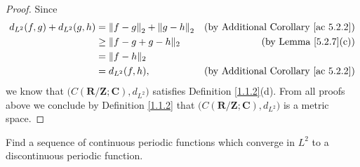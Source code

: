 \begin{proof}
    Since
    \begin{align*}
        d_{L^2}(f, g) + d_{L^2}(g, h) & = \norm*{f - g}_2 + \norm*{g - h}_2 & \text{(by Additional Corollary \ref{ac 5.2.2})} \\
                                      & \geq \norm{f - g + g - h}_2         & \text{(by Lemma \ref{5.2.7}(c))}                \\
                                      & = \norm{f - h}_2                                                                      \\
                                      & = d_{L^2}(f, h),                    & \text{(by Additional Corollary \ref{ac 5.2.2})}
    \end{align*}
    we know that \(\big(C(\mathbf{R} / \mathbf{Z} ; \mathbf{C}), d_{L^2}\big)\) satisfies Definition \ref{1.1.2}(d).
    From all proofs above we conclude by Definition \ref{1.1.2} that \(\big(C(\mathbf{R} / \mathbf{Z} ; \mathbf{C}), d_{L^2}\big)\) is a metric space.
\end{proof}

\begin{exercise}\label{ex 5.2.5}
    Find a sequence of continuous periodic functions which converge in \(L^2\) to a discontinuous periodic function.
\end{exercise}

